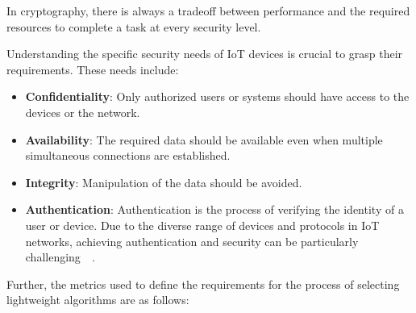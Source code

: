 In cryptography, there is always a tradeoff between performance and the required resources to complete a task at every security level.

Understanding the specific security needs of IoT devices is crucial to grasp their requirements. These needs include:

\begin{itemize}
    \setlength{\itemsep}{-5pt}
    \item \textbf{Confidentiality}: Only authorized users or systems should have access to the devices or the network.
    \item \textbf{Availability}: The required data should be available even when multiple simultaneous connections are established.
    \item \textbf{Integrity}: Manipulation of the data should be avoided.
    \item \textbf{Authentication}: Authentication is the process of verifying the identity of a user or device. Due to the diverse range of devices and protocols in IoT networks, achieving authentication and security can be  particularly challenging~\cite{dutta2019lightweight}~\cite{dhanda2020lightweight}.
\end{itemize}

Further, the metrics used to define the requirements for the process of selecting lightweight algorithms are as follows:

